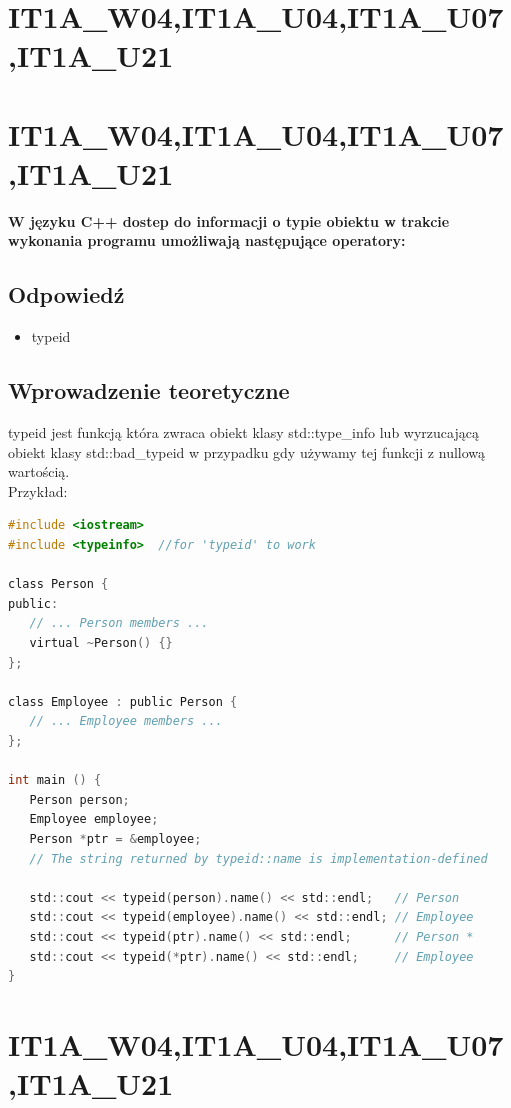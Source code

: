 
\section{IT1A\_W04,IT1A\_U04,IT1A\_U07,IT1A\_U21}


\section{IT1A\_W04,IT1A\_U04,IT1A\_U07,IT1A\_U21}
\textbf{W języku C++ dostep do informacji o typie obiektu w trakcie wykonania programu umożliwają następujące operatory:}

\subsection{Odpowiedź}
\begin{itemize}
\item typeid
\end{itemize}

\subsection{Wprowadzenie teoretyczne}
typeid jest funkcją która zwraca obiekt klasy std::type\_info lub wyrzucającą obiekt klasy std::bad\_typeid w przypadku gdy używamy tej funkcji z nullową wartością.\\
Przykład:
\begin{lstlisting}[language=c]
#include <iostream>
#include <typeinfo>  //for 'typeid' to work

class Person {
public:
   // ... Person members ...
   virtual ~Person() {}
};

class Employee : public Person {
   // ... Employee members ...
};

int main () {
   Person person;
   Employee employee;
   Person *ptr = &employee;
   // The string returned by typeid::name is implementation-defined
   
   std::cout << typeid(person).name() << std::endl;   // Person
   std::cout << typeid(employee).name() << std::endl; // Employee
   std::cout << typeid(ptr).name() << std::endl;      // Person * 
   std::cout << typeid(*ptr).name() << std::endl;     // Employee
}
\end{lstlisting}


\section{IT1A\_W04,IT1A\_U04,IT1A\_U07,IT1A\_U21}
